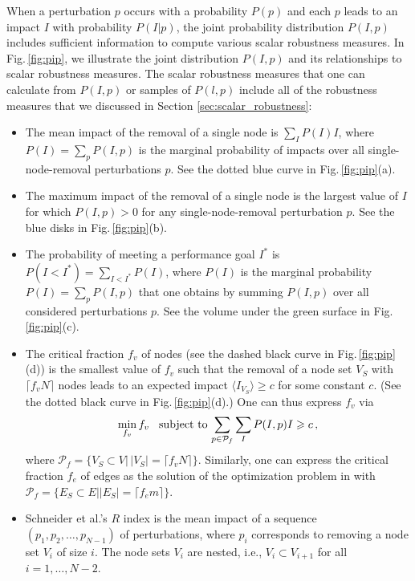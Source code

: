 \documentclass{comnet-mod}
\begin{document}
When a perturbation $p$ occurs with a probability $P(p)$ and each $p$ leads to an impact $I$ with probability $P(I|p)$, the joint probability distribution $P(I,p)$ includes sufficient information to compute various scalar robustness measures. In Fig.\,\ref{fig:pip}, we illustrate the joint distribution $P(I,p)$ and its relationships to scalar robustness measures. The scalar robustness measures that one can calculate from $P(I,p)$ or samples of $P(l,p)$ include all of the robustness measures that we discussed in Section \ref{sec:scalar_robustness}:
\begin{itemize}
    \item{The mean impact of the removal of a single node is $\sum_I P(I)I$, where $P(I) = \sum_{p} P(I,p)$ is the marginal probability of impacts over all single-node-removal perturbations $p$. See the dotted blue curve in Fig.\,\ref{fig:pip}(a).}
    \item{The maximum impact of the removal of a single node is the largest value of $I$ for which $P(I,p) > 0$ for any single-node-removal perturbation $p$. See the blue disks in Fig.\,\ref{fig:pip}(b).} 
    \item{The probability of meeting a performance goal $I^*$ is $P(I<I^*) = \sum_{I<I^*}P(I)$, where $P(I)$ is the marginal probability $P(I) = \sum_{p} P(I,p)$ that one obtains by summing $P(I,p)$ over all considered perturbations $p$. See the volume under the green surface in Fig.\,\ref{fig:pip}(c).}
    \item{The critical fraction $f_v$ of nodes (see the dashed black curve in Fig.\,\ref{fig:pip}(d)) is the smallest value of $f_v$ such that the removal of a node set $V_S$ with $\lceil f_vN \rceil$ nodes leads to an expected impact $\langle I_{V_S} \rangle \geq c$ for some constant $c$. (See the dotted black curve in Fig.\,\ref{fig:pip}(d).) One can thus express $f_v$ via
    \begin{align}
	    \min_{f_v} f_v \hspace{0.3cm}\textrm{subject to}\, \sum_{p \in \mathcal P_f}\sum_I P(I,p)I \geq c\,,
    \label{eq:min-frac}\end{align}
    where $\mathcal P_f = \{V_S\subset V| \, |V_S|=\lceil f_vN\rceil\}$. Similarly, one can express the critical fraction $f_e$ of edges as the solution of the optimization problem in  with $\mathcal P_f=\{E_S\subset E| |E_S| = \lceil f_em \rceil\}$.}
    \item{Schneider et al.'s $R$ index is the mean impact of a sequence $(p_1, p_2, \ldots, p_{N-1})$ of perturbations, where $p_i$ corresponds to removing a node set $V_i$ of size $i$. The node sets $V_i$ are nested, i.e., $V_i\subset V_{i+1}$ for all $i=1,\dots,N-2$.
}
\end{itemize}
\end{document}
